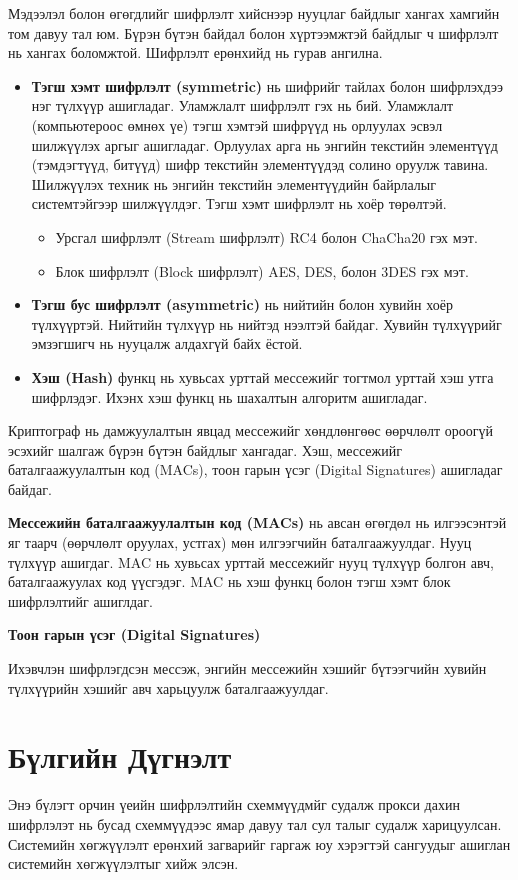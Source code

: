 Мэдээлэл болон өгөгдлийг шифрлэлт хийснээр нууцлаг байдлыг хангах хамгийн том давуу тал юм. Бүрэн бүтэн байдал болон хүртээмжтэй байдлыг ч шифрлэлт нь хангах боломжтой.
Шифрлэлт ерөнхийд нь гурав ангилна.
\begin{itemize}
    \item \textbf{Тэгш хэмт шифрлэлт (symmetric)} нь шифрийг тайлах болон шифрлэхдээ нэг түлхүүр ашигладаг. Уламжлалт шифрлэлт гэх нь бий. Уламжлалт (компьютероос өмнөх үе) тэгш хэмтэй шифрүүд нь орлуулах эсвэл шилжүүлэх аргыг ашигладаг. Орлуулах арга нь энгийн текстийн элементүүд (тэмдэгтүүд, битүүд) шифр текстийн элементүүдэд солино оруулж тавина. Шилжүүлэх техник нь энгийн текстийн элементүүдийн байрлалыг системтэйгээр шилжүүлдэг. 
    Тэгш хэмт шифрлэлт нь хоёр төрөлтэй.
    \begin{itemize}
        \item Урсгал шифрлэлт (Stream шифрлэлт) RC4 болон ChaCha20 гэх мэт.
        \item Блок шифрлэлт (Block шифрлэлт) AES, DES, болон 3DES гэх мэт.
    \end{itemize}
    \item \textbf{Тэгш бус шифрлэлт (asymmetric)} нь нийтийн болон хувийн хоёр түлхүүртэй. Нийтийн түлхүүр нь нийтэд нээлтэй байдаг. Хувийн түлхүүрийг эмзэгшигч нь нууцалж алдахгүй байх ёстой. 
    \item \textbf{Хэш (Hash)} функц нь хувьсах урттай мессежийг тогтмол урттай хэш утга шифрлэдэг. Ихэнх хэш функц нь шахалтын алгоритм ашигладаг.
\end{itemize}

Криптограф нь дамжуулалтын явцад мессежийг хөндлөнгөөс өөрчлөлт ороогүй эсэхийг шалгаж бүрэн бүтэн байдлыг хангадаг. Хэш, мессежийг баталгаажуулалтын код (MACs), тоон гарын үсэг (Digital Signatures) ашигладаг байдаг.

\textbf{Мессежийн баталгаажуулалтын код (MACs)} нь авсан өгөгдөл нь илгээсэнтэй яг таарч (өөрчлөлт оруулах, устгах) мөн илгээгчийн баталгаажуулдаг.
Нууц түлхүүр ашигдаг. MAC нь хувьсах урттай мессежийг нууц түлхүүр болгон авч, баталгаажуулах код үүсгэдэг. MAC нь хэш функц болон тэгш хэмт блок шифрлэлтийг ашиглдаг.

\textbf{Тоон гарын үсэг (Digital Signatures)}

Ихэвчлэн шифрлэгдсэн мессэж, энгийн мессежийн хэшийг бүтээгчийн хувийн түлхүүрийн хэшийг авч харьцуулж баталгаажуулдаг.


\section{Бүлгийн Дүгнэлт}
Энэ бүлэгт орчин үеийн шифрлэлтийн схеммүүдмйг судалж прокси дахин шифрлэлэт нь бусад схеммүүдээс ямар давуу тал сул талыг судалж харицуулсан. Системийн хөгжүүлэлт ерөнхий загварийг гаргаж юу хэрэгтэй сангуудыг ашиглан системийн хөгжүүлэлтыг хийж элсэн.